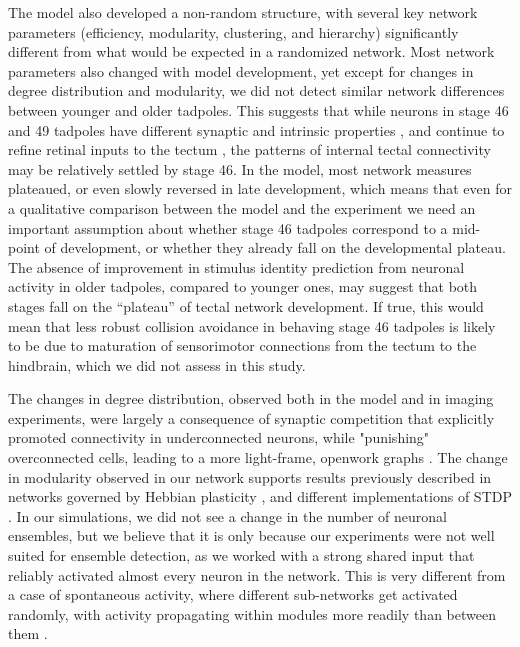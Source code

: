 \documentclass{article}
\begin{document}
The model also developed a non-random structure, with several key network parameters (efficiency, modularity, clustering, and hierarchy) significantly different from what would be expected in a randomized network. Most network parameters also changed with model development, yet except for changes in degree distribution and modularity, we did not detect similar network differences between younger and older tadpoles. This suggests that while neurons in stage 46 and 49 tadpoles have different synaptic and intrinsic properties \citep{ciarleglio2015}, and continue to refine retinal inputs to the tectum \citep{tao2005refinement,munz2014hebbian}, the patterns of internal tectal connectivity may be relatively settled by stage 46. In the model, most network measures plateaued, or even slowly reversed in late development, which means that even for a qualitative comparison between the model and the experiment we need an important assumption about whether stage 46 tadpoles correspond to a mid-point of development, or whether they already fall on the developmental plateau. The absence of improvement in stimulus identity prediction from neuronal activity in older tadpoles, compared to younger ones, may suggest that both stages fall on the “plateau” of tectal network development. If true, this would mean that less robust collision avoidance in behaving stage 46 tadpoles \citep{dong2009} is likely to be due to maturation of sensorimotor connections from the tectum to the hindbrain, which we did not assess in this study.

The changes in degree distribution, observed both in the model and in imaging experiments, were largely a consequence of synaptic competition that explicitly promoted connectivity in underconnected neurons, while "punishing" overconnected cells, leading to a more light-frame, openwork graphs \citep{fiete2010chains}. The change in modularity observed in our network supports results previously described in networks governed by Hebbian plasticity \citep{triplett2018emergence,damicelli2018topomod}, and different implementations of STDP \citep{stam2010modular,litwin2014assemblies}. In our simulations, we did not see a change in the number of neuronal ensembles, but we believe that it is only because our experiments were not well suited for ensemble detection, as we worked with a strong shared input that reliably activated almost every neuron in the network. This is very different from a case of spontaneous activity, where different sub-networks get activated randomly, with activity propagating within modules more readily than between them \citep{avitan2017spontaneous}.
\end{document}
